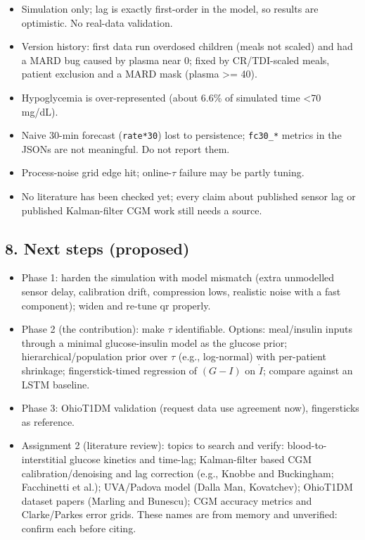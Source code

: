 \documentclass[11pt,a4paper]{article}
\providecommand{\tightlist}{\setlength{\itemsep}{0pt}\setlength{\parskip}{0pt}}
\begin{document}
\begin{itemize}
\tightlist
\item
  Simulation only; lag is exactly first-order in the model, so results
  are optimistic. No real-data validation.
\item
  Version history: first data run overdosed children (meals not scaled)
  and had a MARD bug caused by plasma near 0; fixed by CR/TDI-scaled
  meals, patient exclusion and a MARD mask (plasma \textgreater= 40).
\item
  Hypoglycemia is over-represented (about 6.6\% of simulated time
  \textless70 mg/dL).
\item
  Naive 30-min forecast (\texttt{rate*30}) lost to persistence;
  \texttt{fc30\_*} metrics in the JSONs are not meaningful. Do not
  report them.
\item
  Process-noise grid edge hit; online-\(\tau\) failure may be partly
  tuning.
\item
  No literature has been checked yet; every claim about published sensor
  lag or published Kalman-filter CGM work still needs a source.
\end{itemize}

\hypertarget{8-next-steps-proposed}{%
\subsection{8. Next steps (proposed)}\label{8-next-steps-proposed}}

\begin{itemize}
\tightlist
\item
  Phase 1: harden the simulation with model mismatch (extra unmodelled
  sensor delay, calibration drift, compression lows, realistic noise
  with a fast component); widen and re-tune qr properly.
\item
  Phase 2 (the contribution): make \(\tau\) identifiable. Options:
  meal/insulin inputs through a minimal glucose-insulin model as the
  glucose prior; hierarchical/population prior over \(\tau\) (e.g.,
  log-normal) with per-patient shrinkage; fingerstick-timed regression
  of \((G - I)\) on \(\dot I\); compare against an LSTM baseline.
\item
  Phase 3: OhioT1DM validation (request data use agreement now),
  fingersticks as reference.
\item
  Assignment 2 (literature review): topics to search and verify:
  blood-to-interstitial glucose kinetics and time-lag; Kalman-filter
  based CGM calibration/denoising and lag correction (e.g., Knobbe and
  Buckingham; Facchinetti et al.); UVA/Padova model (Dalla Man,
  Kovatchev); OhioT1DM dataset papers (Marling and Bunescu); CGM
  accuracy metrics and Clarke/Parkes error grids. These names are from
  memory and unverified: confirm each before citing.
\end{itemize}
\end{document}
